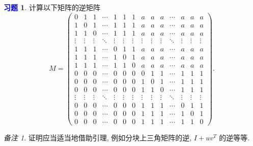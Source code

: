\documentclass[11pt]{ctexart}
\theoremstyle{definition}
\numberwithin{equation}{section}
\theoremstyle{definition}
\newtheorem{exercise}{\textcolor{blue}{习题}}
\theoremstyle{remark}
\newtheorem*{remark}{备注}
\begin{document}
\begin{exercise}
    计算以下矩阵的逆矩阵
    \setcounter{MaxMatrixCols}{14}
    \begin{equation}
        M=\begin{pmatrix}
            0 & 1 & 1 & \cdots  & 1 & 1 & 1 & a & a & a & \cdots  & a & a & a\\
            1 & 0 & 1 & \cdots  & 1 & 1 & 1 & a & a & a & \cdots  & a & a & a\\
            1 & 1 & 0 & \cdots  & 1 & 1 & 1 & a & a & a & \cdots  & a & a & a\\
            \vdots  & \vdots  & \vdots  & \ddots  & \vdots  & \vdots  & \vdots  & \vdots  & \vdots  & \vdots  & \ddots  & \vdots  & \vdots  & \vdots \\
            1 & 1 & 1 & \cdots  & 0 & 1 & 1 & a & a & a & \cdots  & a & a & a\\
            1 & 1 & 1 & \cdots  & 1 & 0 & 1 & a & a & a & \cdots  & a & a & a\\
            1 & 1 & 1 & \cdots  & 1 & 1 & 0 & a & a & a & \cdots  & a & a & a\\
            0 & 0 & 0 & \cdots  & 0 & 0 & 0 & 0 & 1 & 1 & \cdots  & 1 & 1 & 1\\
            0 & 0 & 0 & \cdots  & 0 & 0 & 0 & 1 & 0 & 1 & \cdots  & 1 & 1 & 1\\
            0 & 0 & 0 & \cdots  & 0 & 0 & 0 & 1 & 1 & 0 & \cdots  & 1 & 1 & 1\\
            \vdots  & \vdots  & \vdots  & \ddots  & \vdots  & \vdots  & \vdots  & \vdots  & \vdots  & \vdots  & \ddots  & \vdots  & \vdots  & \vdots \\
            0 & 0 & 0 & \cdots  & 0 & 0 & 0 & 1 & 1 & 1 & \cdots  & 0 & 1 & 1\\
            0 & 0 & 0 & \cdots  & 0 & 0 & 0 & 1 & 1 & 1 & \cdots  & 1 & 0 & 1\\
            0 & 0 & 0 & \cdots  & 0 & 0 & 0 & 1 & 1 & 1 & \cdots  & 1 & 1 & 0
            \end{pmatrix}.
    \end{equation}
\end{exercise}

\begin{remark}
    证明应当适当地借助引理, 例如分块上三角矩阵的逆, $I+uv^T$ 的逆等等. 
\end{remark}
\end{document}
